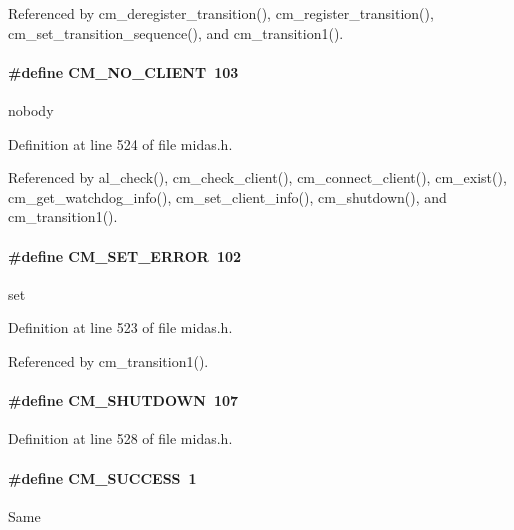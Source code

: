 Referenced by cm\_\-deregister\_\-transition(), cm\_\-register\_\-transition(), cm\_\-set\_\-transition\_\-sequence(), and cm\_\-transition1().
\paragraph[{CM\_\-NO\_\-CLIENT}]{\setlength{\rightskip}{0pt plus 5cm}\#define CM\_\-NO\_\-CLIENT~103}\hfill\label{group__err21_gaae1164bcc7a30753d96723b897ce234e}
nobody 

Definition at line 524 of file midas.h.

Referenced by al\_\-check(), cm\_\-check\_\-client(), cm\_\-connect\_\-client(), cm\_\-exist(), cm\_\-get\_\-watchdog\_\-info(), cm\_\-set\_\-client\_\-info(), cm\_\-shutdown(), and cm\_\-transition1().
\paragraph[{CM\_\-SET\_\-ERROR}]{\setlength{\rightskip}{0pt plus 5cm}\#define CM\_\-SET\_\-ERROR~102}\hfill\label{group__err21_ga2559211d26add70c0fdc21958ed0e9e1}
set 

Definition at line 523 of file midas.h.

Referenced by cm\_\-transition1().
\paragraph[{CM\_\-SHUTDOWN}]{\setlength{\rightskip}{0pt plus 5cm}\#define CM\_\-SHUTDOWN~107}\hfill\label{group__err21_ga76db0fac26b6f3dcdc29ec8b640c5a5f}

\begin{DoxyItemize}
\item 
\end{DoxyItemize}

Definition at line 528 of file midas.h.
\paragraph[{CM\_\-SUCCESS}]{\setlength{\rightskip}{0pt plus 5cm}\#define CM\_\-SUCCESS~1}\hfill\label{group__err21_ga0180947941230d805f5dbb6f1801c17c}
Same 

